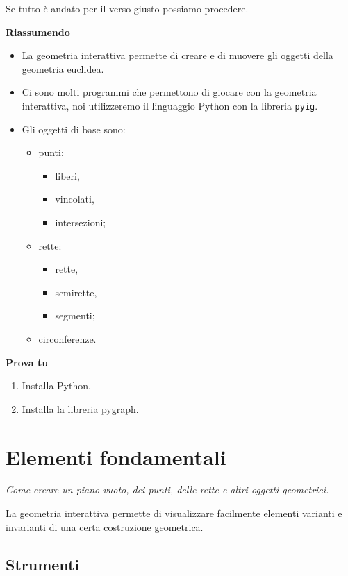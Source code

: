 Se tutto è andato per il verso giusto possiamo procedere.

\textbf{Riassumendo}
\begin{itemize} [noitemsep]
\item La geometria interattiva permette di creare e di muovere gli oggetti 
della geometria euclidea.

\item Ci sono molti programmi che permettono di giocare con la geometria
interattiva, noi utilizzeremo il linguaggio Python con la libreria 
\texttt{pyig}.

\item Gli oggetti di base sono:
\begin{itemize} [noitemsep]
\item punti:
\begin{itemize} [noitemsep]
\item liberi,
\item vincolati,
\item intersezioni;
\end{itemize}

\item rette:
\begin{itemize} [noitemsep]
\item rette,
\item semirette,
\item segmenti;
\end{itemize}
\item circonferenze.
\end{itemize}
\end{itemize}

\textbf{Prova tu}
\begin{enumerate} [noitemsep]
\item Installa Python.
\item Installa la libreria pygraph.
\end{enumerate}


\section{Elementi fondamentali}
\label{sec:elementi-fondamentali}
\emph{Come creare un piano vuoto, dei punti, delle rette e altri
oggetti geometrici.}

La geometria interattiva permette di visualizzare facilmente elementi
varianti e invarianti di una certa costruzione geometrica.

\subsection{Strumenti}

